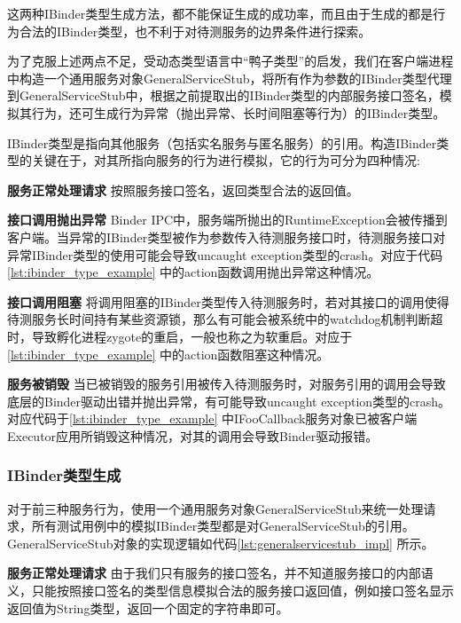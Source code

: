\documentclass[winfonts,master,twoside]{njuthesis}
\begin{document}
这两种IBinder类型生成方法，都不能保证生成的成功率，而且由于生成的都是行为合法的IBinder类型，也不利于对待测服务的边界条件进行探索。

为了克服上述两点不足，受动态类型语言中“鸭子类型”的启发，我们在客户端进程中构造一个通用服务对象GeneralServiceStub，将所有作为参数的IBinder类型代理到GeneralServiceStub中，根据之前提取出的IBinder类型的内部服务接口签名，模拟其行为，还可生成行为异常（抛出异常、长时间阻塞等行为）的IBinder类型。



IBinder类型是指向其他服务（包括实名服务与匿名服务）的引用。构造IBinder类型的关键在于，对其所指向服务的行为进行模拟，它的行为可分为四种情况:

\textbf{服务正常处理请求} \quad 按照服务接口签名，返回类型合法的返回值。

\textbf{接口调用抛出异常} \quad Binder IPC中，服务端所抛出的RuntimeException会被传播到客户端。当异常的IBinder类型被作为参数传入待测服务接口时，待测服务接口对异常IBinder类型的使用可能会导致uncaught exception类型的crash。对应于代码\ref{lst:ibinder_type_example} 中的action函数调用抛出异常这种情况。

\textbf{接口调用阻塞} \quad 将调用阻塞的IBinder类型传入待测服务时，若对其接口的调用使得待测服务长时间持有某些资源锁，那么有可能会被系统中的watchdog机制判断超时，导致孵化进程zygote的重启，一般也称之为软重启。对应于\ref{lst:ibinder_type_example} 中的action函数阻塞这种情况。

\textbf{服务被销毁} \quad 当已被销毁的服务引用被传入待测服务时，对服务引用的调用会导致底层的Binder驱动出错并抛出异常，有可能导致uncaught exception类型的crash。对应代码于\ref{lst:ibinder_type_example} 中IFooCallback服务对象已被客户端Executor应用所销毁这种情况，对其的调用会导致Binder驱动报错。



\subsubsection{IBinder类型生成}

对于前三种服务行为，使用一个通用服务对象GeneralServiceStub来统一处理请求，所有测试用例中的模拟IBinder类型都是对GeneralServiceStub的引用。GeneralServiceStub对象的实现逻辑如代码\ref{lst:generalservicestub_impl} 所示。

\textbf{服务正常处理请求} \quad 由于我们只有服务的接口签名，并不知道服务接口的内部语义，只能按照接口签名的类型信息模拟合法的服务接口返回值，例如接口签名显示返回值为String类型，返回一个固定的字符串即可。
\end{document}
